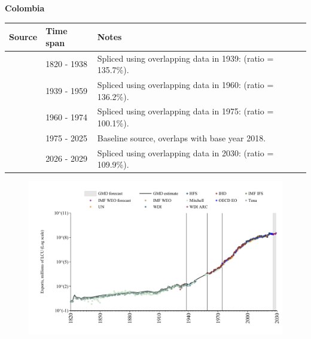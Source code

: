 \documentclass[12pt,a4paper,landscape]{article}
\begin{document}
\begin{adjustbox}{max totalsize={\paperwidth}{\paperheight},center}
\begin{minipage}[t][\textheight][t]{\textwidth}
\vspace*{0.5cm}
{}
\begin{center}
{\Large\bfseries Colombia}
\end{center}
\vspace{0.5cm}
\begin{table}[H]
\centering
\small
\begin{tabular}{|l|l|l|}
\hline
\textbf{Source} & \textbf{Time span} & \textbf{Notes} \\
\hline
\rowcolor{white}\cite{Tena}& 1820 - 1938 &Spliced using overlapping data in 1939: (ratio = 135.7\%).\\
\rowcolor{lightgray}\cite{Mitchell}& 1939 - 1959 &Spliced using overlapping data in 1960: (ratio = 136.2\%).\\
\rowcolor{white}\cite{WDI}& 1960 - 1974 &Spliced using overlapping data in 1975: (ratio = 100.1\%).\\
\rowcolor{lightgray}\cite{OECD_EO}& 1975 - 2025 &Baseline source, overlaps with base year 2018.\\
\rowcolor{white}\cite{IMF_WEO_forecast}& 2026 - 2029 &Spliced using overlapping data in 2030: (ratio = 109.9\%).\\
\hline
\end{tabular}
\end{table}
\begin{figure}[H]
\centering
\includegraphics[width=\textwidth,height=0.6\textheight,keepaspectratio]{graphs/COL_exports.pdf}
\end{figure}
\end{minipage}
\end{adjustbox}
\end{document}
